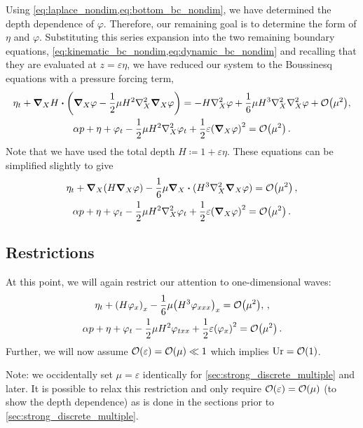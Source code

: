 \documentclass{jfm}
\let\Oldsubsection\subsection
\renewcommand{\subsection}{\FloatBarrier\Oldsubsection}
\DeclareMathOperator{\Ur}{Ur}
\renewcommand*{\epsilon}{\varepsilon}
\begin{document}
Using \cref{eq:laplace_nondim,eq:bottom_bc_nondim}, we have determined
the depth dependence of $\varphi$.
Therefore, our remaining goal is to determine the form of $\eta$ and
$\varphi$.
Substituting this series expansion into the two
remaining boundary equations,
\cref{eq:kinematic_bc_nondim,eq:dynamic_bc_nondim} and recalling that
they are evaluated at $z=\epsilon \eta$, we have reduced our system to
the Boussinesq equations with a pressure forcing term,
\begin{gather}
  \eta_t + \grad_X{H}\vdot\pqty{\grad_X\varphi
    -\frac{1}{2}\mu H^2\laplacian_X\grad_X\varphi} =
    -H\laplacian_X\varphi
  +\frac{1}{6}\mu H^3\laplacian_X\laplacian_X\varphi +
    \order{\mu^2}, \\
  \alpha p + \eta + \varphi_{t} - \frac{1}{2}\mu
    H^2\laplacian_X\varphi_{t} + \frac{1}{2}\epsilon
    \pqty{\grad_X\varphi}^2 = \order{\mu^2} \,.
\end{gather}
Note that we have used the total depth $H\coloneqq 1+\epsilon\eta$.
These equations can be simplified slightly to give
\begin{gather}
  \eta_t + \grad_X(H\grad_X\varphi)
    -\frac{1}{6}\mu \grad_X\vdot(H^3\laplacian_X\grad_X\varphi) =
    \order{\mu^2} \,, \\
  \alpha p + \eta + \varphi_{t} - \frac{1}{2}\mu
    H^2\laplacian_X\varphi_{t} +
    \frac{1}{2}\epsilon\pqty{\grad_X\varphi}^2 = \order{\mu^2} \,.
\end{gather}

\subsection{Restrictions}
At this point, we will again restrict our attention to one-dimensional
waves:
\begin{gather}
  \eta_t + \pqty{H\varphi_x}_x
    -\frac{1}{6}\mu \pqty{H^3\varphi_{xxx}}_x =
    \order{\mu^2}, \label{eq:kinematic_bc_varphi} \,, \\
  \alpha p +\eta + \varphi_t - \frac{1}{2}\mu H^2\varphi_{txx} +
    \frac{1}{2}\epsilon\pqty{\varphi_x}^2 = \order{\mu^2} \,.
  \label{eq:dynamic_bc_varphi}
\end{gather}
Further, we will now assume $\order{\epsilon} = \order{\mu} \ll 1$ which
implies $\Ur = \order{1}$.

Note: we occidentally set $\mu=\epsilon$ identically for
\cref{sec:strong_discrete_multiple} and later.
It is possible to relax this restriction and only require
$\order{\epsilon} = \order{\mu}$ (to show the depth dependence) as is
done in the sections prior to \cref{sec:strong_discrete_multiple}.
\end{document}
